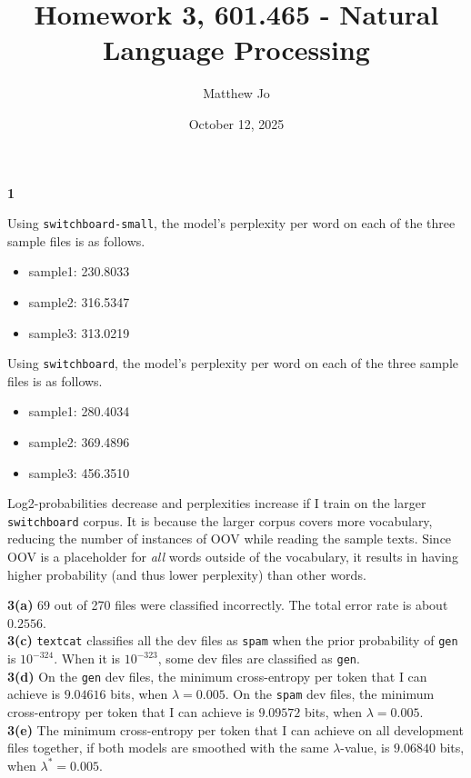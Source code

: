 \documentclass{article}
\title{Homework 3, 601.465 - Natural Language Processing}
\author{Matthew Jo}
\date{October 12, 2025}
\begin{document}
\maketitle

\textbf{1}

Using \texttt{switchboard-small}, the model's perplexity per word on each of the three sample files is as follows.
\begin{itemize}
	\item sample1: 230.8033
	\item sample2: 316.5347
	\item sample3: 313.0219
\end{itemize}

Using \texttt{switchboard}, the model's perplexity per word on each of the three sample files is as follows.
\begin{itemize}
	\item sample1: 280.4034
	\item sample2: 369.4896
	\item sample3: 456.3510
\end{itemize}

Log2-probabilities decrease and perplexities increase if I train on the larger \texttt{switchboard} corpus. It is because the larger corpus covers more vocabulary, reducing the number of instances of OOV while reading the sample texts. Since OOV is a placeholder for \textit{all} words outside of the vocabulary, it results in having higher probability (and thus lower perplexity) than other words.

\pagebreak

\textbf{3(a)} 69 out of 270 files were classified incorrectly. The total error rate is about $0.2556$. \\

\textbf{3(c)} \texttt{textcat} classifies all the dev files as \texttt{spam} when the prior probability of \texttt{gen} is $10^{-324}$. When it is $10^{-323}$, some dev files are classified as \texttt{gen}. \\

\textbf{3(d)} On the \texttt{gen} dev files, the minimum cross-entropy per token that I can achieve is $9.04616$ bits, when $\lambda = 0.005$. On the \texttt{spam} dev files, the minimum cross-entropy per token that I can achieve is $9.09572$ bits, when $\lambda = 0.005$. \\

\textbf{3(e)} The minimum cross-entropy per token that I can achieve on all development files together, if both models are smoothed with the same $\lambda$-value, is $9.06840$ bits, when $\lambda^* = 0.005$. \\
\end{document}
